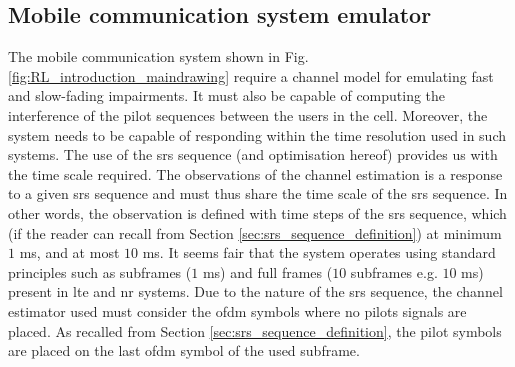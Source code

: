 \subsection{Mobile communication system emulator}
The mobile communication system shown in Fig. \ref{fig:RL_introduction_maindrawing} require a channel model for emulating fast and slow-fading impairments. It must also be capable of computing the interference of the pilot sequences between the users in the cell. Moreover, the system needs to be capable of responding within the time resolution used in such systems. The use of the \gls{srs} sequence (and optimisation hereof) provides us with the time scale required. The observations of the channel estimation is a response to a given \gls{srs} sequence and must thus share the time scale of the \gls{srs} sequence. In other words, the observation is defined with time steps of the \gls{srs} sequence, which (if the reader can recall from Section \ref{sec:srs_sequence_definition}) at minimum $1$ ms, and at most $10$ ms. It seems fair that the system operates using standard principles such as subframes ($1$ ms) and full frames ($10$ subframes e.g. $10$ ms) present in \gls{lte} and \gls{nr} systems. Due to the nature of the \gls{srs} sequence, the channel estimator used must consider the \gls{ofdm} symbols where no pilots signals are placed. As recalled from Section \ref{sec:srs_sequence_definition}, the pilot symbols are placed on the last \gls{ofdm} symbol of the used subframe. 


